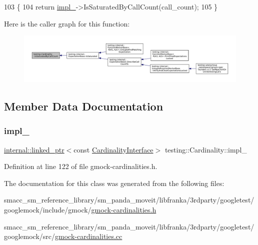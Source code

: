 \begin{DoxyCode}
103                                                     \{
104     \textcolor{keywordflow}{return} \hyperlink{classtesting_1_1Cardinality_ae8c43c635af16756d535b491ccf19c2f}{impl\_}->IsSaturatedByCallCount(call\_count);
105   \}
\end{DoxyCode}
Here is the caller graph for this function\+:
\nopagebreak
\begin{figure}[H]
\begin{center}
\leavevmode
\includegraphics[width=350pt]{classtesting_1_1Cardinality_a57128ba46931e24a2b39af177e3346f8_icgraph}
\end{center}
\end{figure}


\subsection{Member Data Documentation}
\mbox{\label{classtesting_1_1Cardinality_ae8c43c635af16756d535b491ccf19c2f}} 
\subsubsection{\texorpdfstring{impl\+\_\+}{impl\_}}
{\footnotesize\ttfamily \hyperlink{classtesting_1_1internal_1_1linked__ptr}{internal\+::linked\+\_\+ptr}$<$const \hyperlink{classtesting_1_1CardinalityInterface}{Cardinality\+Interface}$>$ testing\+::\+Cardinality\+::impl\+\_\+\hspace{0.3cm}{\ttfamily [private]}}



Definition at line 122 of file gmock-\/cardinalities.\+h.



The documentation for this class was generated from the following files\+:\begin{DoxyCompactItemize}
\item 
smacc\+\_\+sm\+\_\+reference\+\_\+library/sm\+\_\+panda\+\_\+moveit/libfranka/3rdparty/googletest/googlemock/include/gmock/\hyperlink{gmock-cardinalities_8h}{gmock-\/cardinalities.\+h}\item 
smacc\+\_\+sm\+\_\+reference\+\_\+library/sm\+\_\+panda\+\_\+moveit/libfranka/3rdparty/googletest/googlemock/src/\hyperlink{gmock-cardinalities_8cc}{gmock-\/cardinalities.\+cc}\end{DoxyCompactItemize}
